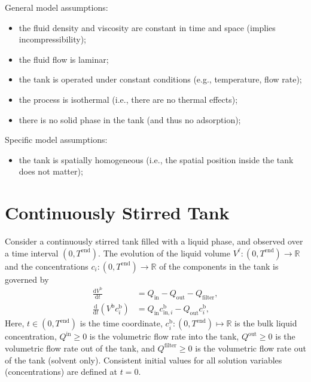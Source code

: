 \documentclass{article}
\begin{document}
General model assumptions:
\begin{itemize}
\item the fluid density and viscosity are constant in time and space (implies incompressibility);
\item the fluid flow is laminar;
\item the tank is operated under constant conditions (e.g., temperature, flow rate);
\item the process is isothermal (i.e., there are no thermal effects);
\item there is no solid phase in the tank (and thus no adsorption);
\end{itemize}


Specific model assumptions:
\begin{itemize}
\item the tank is spatially homogeneous (i.e., the spatial position inside the tank does not matter);
\end{itemize}


\section*{Continuously Stirred Tank}
Consider a continuously stirred tank filled with a liquid phase, and observed over a time interval $(0, T^{\mathrm{end}})$.
The evolution of the liquid volume $V^{\mathrm{\ell}}\colon (0, T^{\mathrm{end}}) \to \mathbb{R}$ and the concentrations $c_i\colon (0, T^{\mathrm{end}}) \to \mathbb{R}$ of the components in the tank is governed by
\begin{align}

    \frac{\mathrm{d}V^{\mathrm{b}}}{\mathrm{d}t} &= Q_{\mathrm{in}} - Q_{\mathrm{out}} - Q_{\mathrm{filter}},
    \\
    \frac{\mathrm{d}}{\mathrm{d} t} \left( V^{\mathrm{b}} c^{\mathrm{b}}_i \right)&= Q_{\mathrm{in}} c^{\mathrm{b}}_{\mathrm{in},i} - Q_{\mathrm{out}} c^{\mathrm{b}}_i,
\end{align}
Here, $t\in (0, T^{\mathrm{end}})$ is the time coordinate, $c^\mathrm{b}_i\colon (0, T^\mathrm{end}) \mapsto \mathbb{R}$ is the bulk liquid concentration, $Q^\mathrm{in}\geq 0$ is the volumetric flow rate into the tank, $Q^\mathrm{out}\geq 0$ is the volumetric flow rate out of the tank, and $Q^\mathrm{filter}\geq 0$ is the volumetric flow rate out of the tank (solvent only).
Consistent initial values for all solution variables (concentrations) are defined at $t = 0$.
\end{document}
